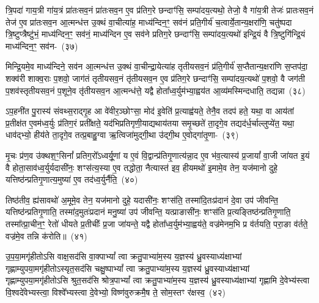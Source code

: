 त्रि॒पदा॑ गाय॒त्री गा॑य॒त्रं प्रा॑तःसव॒नं प्रा॑तःसव॒न ए॒व प्र॑तिग॒रे छन्दाꣳ॑सि॒ सम्पा॑दय॒त्यथो॒ तेजो॒ वै गा॑य॒त्री तेजः॑ प्रातःसव॒नं तेज॑ ए॒व प्रा॑तःसव॒न आ॒त्मन्ध॑त्त उ॒क्थं वा॒चीत्या॑ह॒ माध्य॑न्दिन॒ꣳ॒ सव॑नं प्रति॒गीर्य॑ च॒त्वार्ये॒तान्य॒क्षरा॑णि॒ चतु॑ष्पदा त्रि॒ष्टुप्त्रैष्टु॑भं॒ माध्य॑न्दिन॒ꣳ॒ सव॑नं॒ माध्य॑न्दिन ए॒व सव॑ने प्रतिग॒रे छन्दाꣳ॑सि॒ सम्पा॑दय॒त्यथो॑ इन्द्रि॒यं वै त्रि॒ष्टुगि॑न्द्रि॒यं माध्य॑न्दिन॒ꣳ॒ सव॑न-~(३७)\ip

मिन्द्रि॒यमे॒व माध्य॑न्दिने॒ सव॑न आ॒त्मन्ध॑त्त उ॒क्थं वा॒चीन्द्रा॒येत्या॑ह तृतीय\-सव॒नं प्र॑ति॒गीर्य॑ स॒प्तैतान्य॒क्षरा॑णि स॒प्तप॑दा॒ शक्व॑री शाक्व॒राः प॒शवो॒ जाग॑तं तृतीय\-सव॒नं तृ॑तीय\-सव॒न ए॒व प्र॑तिग॒रे छन्दाꣳ॑सि॒ सम्पा॑दय॒त्यथो॑ प॒शवो॒ वै जग॑ती प॒शव॑स्तृतीय\-सव॒नं प॒शूने॒व तृ॑तीय\-सव॒न आ॒त्मन्ध॑त्ते॒ यद्वै होता᳚ध्व॒र्युम॑भ्या॒ह्वय॑त आ॒व्य॑मस्मिन्दधाति॒ तद्यन्ना~(३८)\ip

ऽप॒हनी॑त पु॒रास्य॑ संवथ्स॒राद्गृ॒ह आ वे॑वीर॒ञ्छोꣳसा॒ मोद॑ इ॒वेति॑ प्र॒त्याह्व॑यते॒ तेनै॒व तदप॑ हते॒ यथा॒ वा आय॑तां प्र॒तीक्ष॑त ए॒वम॑ध्व॒र्युः प्र॑तिग॒रं प्रती᳚क्षते॒ यद॑भिप्रतिगृणी॒याद्यथाय॑तया समृ॒च्छते॑ ता॒दृगे॒व तद्यद॑र्ध॒र्चाल्लुप्ये॑त॒ यथा॒ धाव॑द्भ्यो॒ हीय॑ते ता॒दृगे॒व तत्प्र॒बाहु॒ग्वा ऋ॒त्विजा॑मुद्गी॒था उ॑द्गी॒थ ए॒वोद्गा॑तृ॒णा-~(३९)\ip

मृ॒चः प्र॑ण॒व उ॑क्थश॒ꣳ॒सिनां᳚ प्रतिग॒रो᳚\-ऽध्वर्यू॒णां य ए॒वं वि॒द्वान्प्र॑तिगृ॒णात्य॑न्ना॒द ए॒व भ॑व॒त्यास्य॑ प्र॒जायां᳚ वा॒जी जा॑यत इ॒यं वै होता॒साव॑ध्व॒र्युर्यदासी॑नः॒ शꣳस॑त्य॒स्या ए॒व तद्धोता॒ नैत्यास्त॑ इव॒ हीयमथो॑ इ॒मामे॒व तेन॒ यज॑मानो दुहे॒ यत्तिष्ठ॑न्प्रतिगृ॒णात्य॒मुष्या॑ ए॒व तद॑ध्व॒र्युर्नैति॒~(४०)\ip

तिष्ठ॑तीव॒ ह्य॑सावथो॑ अ॒मूमे॒व तेन॒ यज॑मानो दुहे॒ यदासी॑नः॒ शꣳस॑ति॒ तस्मा॑दि॒तःप्र॑दानं दे॒वा उप॑ जीवन्ति॒ यत्तिष्ठ॑न्प्रतिगृ॒णाति॒ तस्मा॑द॒मुतः॑प्रदानं मनु॒ष्या॑ उप॑ जीवन्ति॒ यत्प्राङासी॑नः॒ शꣳस॑ति प्र॒त्यङ्तिष्ठ॑न्प्रतिगृ॒णाति॒ तस्मा᳚त्प्रा॒चीन॒ꣳ॒ रेतो॑ धीयते प्र॒तीचीः᳚ प्र॒जा जा॑यन्ते॒ यद्वै होता᳚ध्व॒र्युम॑भ्या॒ह्वय॑ते॒ वज्र॑मेनम॒भि प्र व॑र्तयति॒ परा॒ङा व॑र्तते॒ वज्र॑मे॒व तन्नि क॑रोति॥~(४१)\ip

{\anuvakamend[{सव॑ने॒ वज्र॑म॒न्तर्ध॑त्ते॒ त्रीण्ये॒तान्य॒क्षरा॑णीन्द्रि॒यं माध्य॑न्दिन॒ꣳ॒ सव॑न॒न्नोद्गा॑तृ॒णाम॑ध्व॒र्युर्नैति॑ वर्तयत्य॒ष्टौ च॑}]}

उ॒प॒या॒मगृ॑हीतो\-ऽसि वाक्ष॒सद॑सि वा॒क्पा\-भ्यां᳚ त्वा क्रतु॒पाभ्या॑म॒स्य य॒ज्ञस्य॑ ध्रु॒वस्याध्य॑क्षाभ्यां गृह्णाम्युपया॒मगृ॑हीतो\-ऽस्यृत॒सद॑सि चक्षु॒ष्पा\-भ्यां᳚ त्वा क्रतु॒पाभ्या॑म॒स्य य॒ज्ञस्य॑ ध्रु॒वस्याध्य॑क्षाभ्यां गृह्णाम्युपया॒मगृ॑हीतो\-ऽसि श्रुत॒सद॑सि श्रोत्र॒पा\-भ्यां᳚ त्वा क्रतु॒पाभ्या॑म॒स्य य॒ज्ञस्य॑ ध्रु॒वस्याध्य॑क्षाभ्यां गृह्णामि दे॒वेभ्य॑स्त्वा वि॒श्वदे॑वेभ्यस्त्वा॒ विश्वे᳚भ्यस्त्वा दे॒वेभ्यो॒ विष्ण॑वुरुक्रमै॒ष ते॒ सोम॒स्तꣳ र॑क्षस्व॒~(४२)\ip

